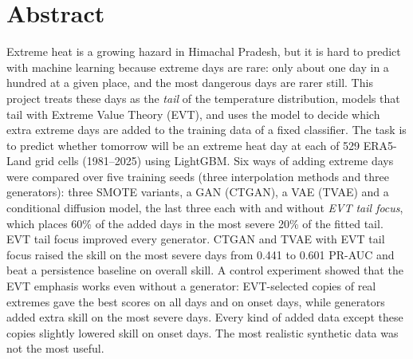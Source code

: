 \documentclass[12pt,a4paper]{report}
\begin{document}
\chapter*{Abstract}
Extreme heat is a growing hazard in Himachal Pradesh, but it is hard to predict with machine learning because
extreme days are rare: only about one day in a hundred at a given place, and the most dangerous days are rarer still.
This project treats these days as the \emph{tail} of the temperature distribution, models that tail with Extreme
Value Theory (EVT), and uses the model to decide which extra extreme days are added to the training data of a fixed
classifier. The task is to predict whether tomorrow will be an extreme heat day at each of 529 ERA5-Land grid cells
(1981--2025) using LightGBM. Six ways of adding extreme days were compared over five training seeds (three interpolation methods and three generators): three SMOTE variants,
a GAN (CTGAN), a VAE (TVAE) and a conditional diffusion model, the last three each with and without \emph{EVT tail focus}, which places 60\% of the
added days in the most severe 20\% of the fitted tail. EVT tail focus improved every generator. CTGAN and TVAE with
EVT tail focus raised the skill on the most severe days from 0.441 to 0.601 PR-AUC and beat a persistence baseline on
overall skill. A control experiment showed that the EVT emphasis works even without a generator: EVT-selected copies of real
extremes gave the best scores on all days and on onset days, while generators added extra skill on the most severe
days. Every kind of added data except these copies slightly lowered skill on onset days. The most realistic synthetic data was not the most useful.

\tableofcontents
\listoffigures
\listoftables

\end{document}
